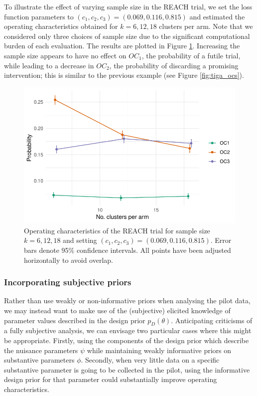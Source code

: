 \documentclass[AMA,STIX1COL]{WileyNJD-v2}
\begin{document}
To illustrate the effect of varying sample size in the REACH trial, we set the loss function parameters to $(c_1, c_2, c_3) = (0.069, 0.116, 0.815)$ and estimated the operating characteristics obtained for $k = 6, 12, 18$ clusters per arm. Note that we considered only three choices of sample size due to the significant computational burden of each evaluation. The results are plotted in Figure \ref{fig:k_comp}. Increasing the sample size appears to have no effect on $OC_1$, the probability of a futile trial, while leading to a decrease in $OC_2$, the probability of discarding a promising intervention; this is similar to the previous example (see Figure \ref{fig:tiga_ocs}).

\begin{figure}
\centering
\includegraphics[scale=0.8]{./figures/k_comp}
\caption{Operating characteristics of the REACH trial for sample size $k = 6, 12, 18$ and setting $(c_1, c_2, c_3) = (0.069, 0.116, 0.815)$. Error bars denote 95\% confidence intervals. All points have been adjusted horizontally to avoid overlap.}
\label{fig:k_comp}
\end{figure}

\subsubsection{Incorporating subjective priors}

Rather than use weakly or non-informative priors when analysing the pilot data, we may instead want to make use of the (subjective) elicited knowledge of parameter values described in the design prior $p_D(\theta)$. Anticipating criticisms of a fully subjective analysis, we can envisage two particular cases where this might be appropriate. Firstly, using the components of the design prior which describe the nuisance parameters $\psi$ while maintaining weakly informative priors on substantive parameters $\phi$. Secondly, when very little data on a specific substantive parameter is going to be collected in the pilot, using the informative design prior for that parameter could substantially improve operating characteristics.
\end{document}
